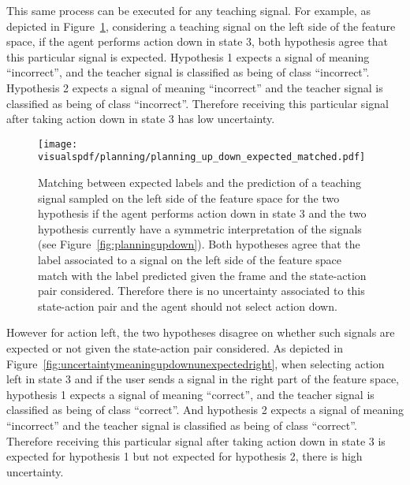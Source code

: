 \newpage

This same process can be executed for any teaching signal. For example, as depicted in Figure~\ref{fig:uncertaintymeaningupdownexpectedleft}, considering a teaching signal on the left side of the feature space, if the agent performs action down in state 3, both hypothesis agree that this particular signal is expected. Hypothesis 1 expects a signal of meaning ``incorrect'', and the teacher signal is classified as being of class ``incorrect''. Hypothesis 2 expects a signal of meaning ``incorrect'' and the teacher signal is classified as being of class ``incorrect''. Therefore receiving this particular signal after taking action down in state 3 has low uncertainty.

\begin{figure}[H]
  \centering
  \texttt{[image: \\visualspdf/planning/planning\_up\_down\_expected\_matched.pdf]}
  \caption{Matching between expected labels and the prediction of a teaching signal sampled on the left side of the feature space for the two hypothesis if the agent performs action down in state 3 and the two hypothesis currently have a symmetric interpretation of the signals (see Figure~\ref{fig:planningupdown}). Both hypotheses agree that the label associated to a signal on the left side of the feature space match with the label predicted given the frame and the state-action pair considered. Therefore there is no uncertainty associated to this state-action pair and the agent should not select action down.}
  \label{fig:uncertaintymeaningupdownexpectedleft}
\end{figure}

\newpage

However for action left, the two hypotheses disagree on whether such signals are expected or not given the state-action pair considered. As depicted in Figure~\ref{fig:uncertaintymeaningupdownunexpectedright}, when selecting action left in state 3 and if the user sends a signal in the right part of the feature space, hypothesis 1 expects a signal of meaning ``correct'', and the teacher signal is classified as being of class ``correct''. And hypothesis 2 expects a signal of meaning ``incorrect'' and the teacher signal is classified as being of class ``correct''. Therefore receiving this particular signal after taking action down in state 3 is expected for hypothesis 1 but not expected for hypothesis 2, there is high uncertainty.

